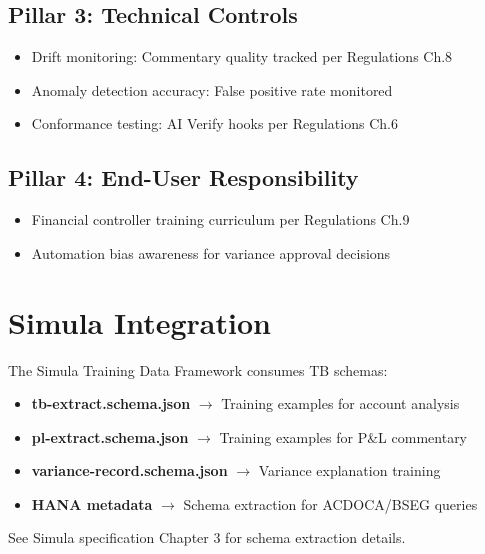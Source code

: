 \subsection{Pillar 3: Technical Controls}

\begin{itemize}
  \item Drift monitoring: Commentary quality tracked per Regulations Ch.8
  \item Anomaly detection accuracy: False positive rate monitored
  \item Conformance testing: AI Verify hooks per Regulations Ch.6
\end{itemize}

\subsection{Pillar 4: End-User Responsibility}

\begin{itemize}
  \item Financial controller training curriculum per Regulations Ch.9
  \item Automation bias awareness for variance approval decisions
\end{itemize}

\section{Simula Integration}
\label{sec:simula-integration}

The Simula Training Data Framework consumes TB schemas:

\begin{itemize}
  \item \textbf{tb-extract.schema.json} $\rightarrow$ Training examples for account analysis
  \item \textbf{pl-extract.schema.json} $\rightarrow$ Training examples for P\&L commentary
  \item \textbf{variance-record.schema.json} $\rightarrow$ Variance explanation training
  \item \textbf{HANA metadata} $\rightarrow$ Schema extraction for ACDOCA/BSEG queries
\end{itemize}

See Simula specification Chapter 3 for schema extraction details.

